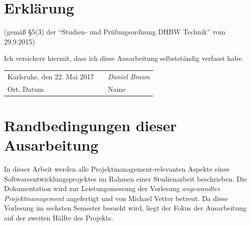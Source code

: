\documentclass[
	pdftex,
	fontsize=12pt,          %
	DIV10,                  %
	ngerman,                %
	paper=a4,               %
	twoside=false,          %
	titlepage,              %
	parskip=half,           %
	headings=normal,        %
	listof=nochaptergap,  %
	bibliography=totoc, %
	index=totoc,            %
	captions=tableheading,  %
	final                 %
]{scrreprt}
\begin{document}
\renewcommand{\thepage}{\Roman{page}}
\setcounter{page}{1}



\chapter*{Erklärung}

\vspace*{2em}

(gemäß §5(3) der \enquote{Studien- und Prüfungsordnung DHBW Technik} vom 29.9.2015)

Ich versichere hiermit, dass ich diese Ausarbeitung selbstständig verfasst habe.

\vspace{3em}
\begin{tabular}{lp{2em}l}
	Karlsruhe, den 22. Mai 2017	&& \textit{Daniel Brown}\hspace{4cm} \\\cline{1-1}\cline{3-3}
	Ort, Datum     				&& Name
\end{tabular}
\newpage



\tableofcontents
\newpage
{}
{}
\listoffigures
\newpage
{}
{}
\listoftables
\newpage
{}
\newpage
\setcounter{SeitenzahlSpeicher}{\value{page}}
\newpage
\renewcommand{\thepage}{\arabic{page}}
\setcounter{page}{1}



\chapter{Randbedingungen dieser Ausarbeitung}

In dieser Arbeit werden alle Projektmanagement-relevanten Aspekte eines Softwareentwicklungsprojektes im Rahmen einer Studienarbeit beschrieben. Die Dokumentation wird zur Leistungsmessung der Vorlesung \textit{angewandtes Projektmanagement} angefertigt und von Michael Vetter betreut.
Da diese Vorlesung im sechsten Semester besucht wird, liegt der Fokus der Ausarbeitung auf der zweiten Hälfte des Projekts.
\end{document}
